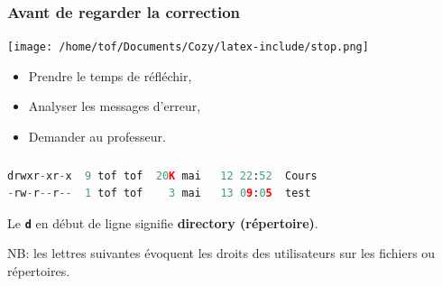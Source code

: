 \documentclass[svgnames,11pt]{beamer}
\begin{document}
\begin{frame}
    \frametitle{Avant de regarder la correction}
\begin{center}
    \centering
    \texttt{[image: /home/tof/Documents/Cozy/latex-include/stop.png]}
    \end{center}
{\Large
    \begin{itemize}
        \item Prendre le temps de réfléchir,
        \item Analyser les messages d'erreur,
        \item Demander au professeur.
    \end{itemize}
}
\end{frame}
\begin{frame}[fragile]
    \frametitle{}
\begin{center}
\begin{lstlisting}[language=Python , basicstyle=\ttfamily\small, xleftmargin=1em, xrightmargin=0em]
drwxr-xr-x  9 tof tof  20K mai   12 22:52  Cours
-rw-r--r--  1 tof tof    3 mai   13 09:05  test
\end{lstlisting}
\end{center}
    
\begin{aretenir}[]
Le \textbf{\texttt{d}} en début de ligne signifie \textbf{directory (répertoire)}.

NB: les lettres suivantes évoquent les droits des utilisateurs sur les fichiers ou répertoires.
\end{aretenir}
\end{frame}
\end{document}
